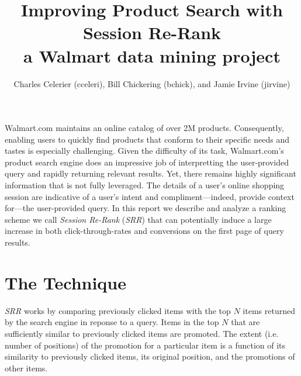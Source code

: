 \documentclass{article}
\title{Improving Product Search with Session Re-Rank\\
    \large{a Walmart data mining project}}
\author{Charles Celerier (cceleri), Bill Chickering (bchick),
        and Jamie Irvine (jirvine)}
\begin{document}
\maketitle

Walmart.com maintains an online catalog of over 2M products. Consequently,
enabling users to quickly find products that conform to their specific needs and
tastes is especially challenging. Given the difficulty of its task,
Walmart.com's product search engine does an impressive job of interpretting the
user-provided query and rapidly returning relevant results. Yet, there remains
highly significant information that is not fully leveraged. The details of a
user's online shopping session are indicative of a user's intent and
compliment---indeed, provide context for---the user-provided query. In this
report we describe and analyze a ranking scheme we call {\em Session Re-Rank}
({\em SRR}) that can potentially induce a large increase in both
click-through-rates and conversions on the first page of query results.

\section{The Technique}\label{sec:technique}

{\em SRR} works by comparing previously clicked items with the top $N$ items
returned by the search engine in reponse to a query. Items in the top $N$ that
are sufficiently similar to previously clicked items are promoted. The extent
(i.e. number of positions) of the promotion for a particular item is a function
of its similarity to previously clicked items, its original position, and the
promotions of other items.
\end{document}
